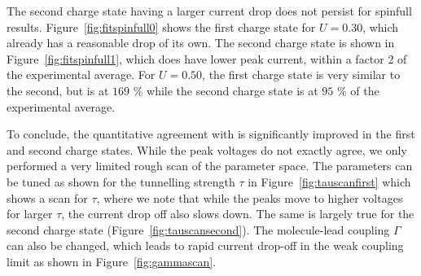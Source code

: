 The second charge state having a larger current drop does not persist for spinfull results. Figure~\ref{fig:fitspinfull0} shows the first charge state for $U=0.30$, which already has a reasonable drop of its own. The second charge state is shown in Figure~\ref{fig:fitspinfull1}, which does have lower peak current, within a factor 2 of the experimental average. For $U=0.50$, the first charge state is very similar to the second, but is at $169$ \% while the second charge state is at $95$ \% of the experimental average.

To conclude, the quantitative agreement with \citet{perrinnano} is significantly improved in the first and second charge states. While the peak voltages do not exactly agree, we only performed a very limited rough scan of the parameter space. The parameters can be tuned as shown for the tunnelling strength $\tau$ in Figure~\ref{fig:tauscanfirst} which shows a scan for $\tau$, where we note that while the peaks move to higher voltages for larger $\tau$, the current drop off also slows down. The same is largely true for the second charge state (Figure~\ref{fig:tauscansecond}). The molecule-lead coupling $\Gamma$ can also be changed, which leads to rapid current drop-off in the weak coupling limit as shown in Figure~\ref{fig:gammascan}.

